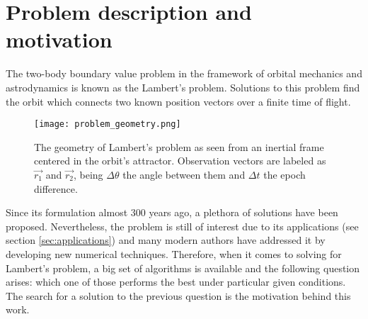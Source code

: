 \section{Problem description and motivation}

The two-body boundary value problem in the framework of orbital mechanics and
astrodynamics is known as the Lambert's problem. Solutions to this problem find
the orbit which connects two known position vectors over a finite time of
flight.

\begin{figure}[H]
  \centering
  \texttt{[image: problem\_geometry.png]}
  \caption[The geometry of Lambert's problem]{
    The geometry of Lambert's problem as seen from an inertial frame
    centered in the orbit's attractor. Observation vectors are labeled as
    $\vec{r_{1}}$ and $\vec{r_{2}}$, being $\Delta \theta$ the angle between
    them and $\Delta t$ the epoch difference.
  }
  \label{fig:problem_geometry}
\end{figure}

Since its formulation almost 300 years ago, a plethora of solutions have been
proposed. Nevertheless, the problem is still of interest due to its applications
(see section \ref{sec:applications}) and many modern authors have addressed it
by developing new numerical techniques. Therefore, when it comes to solving for
Lambert's problem, a big set of algorithms is available and the following
question arises: which one of those performs the best under particular given
conditions. The search for a solution to the previous question is the motivation
behind this work.
